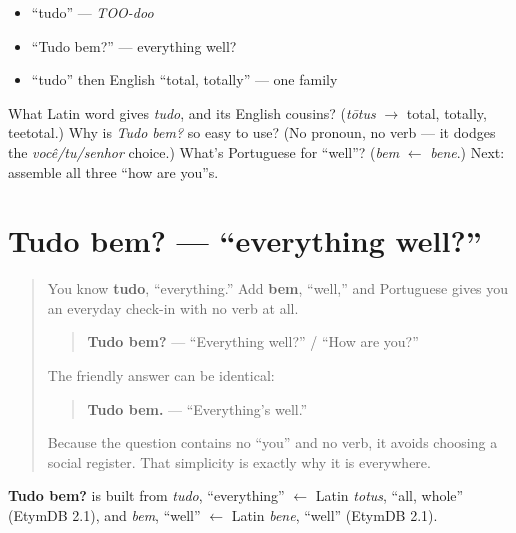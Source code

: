 \begin{itemize}
\raggedright
  \item \textquotedblleft{}tudo\textquotedblright{} — \emph{TOO-doo}
  \item \textquotedblleft{}Tudo bem?\textquotedblright{} — everything well?
  \item \textquotedblleft{}tudo\textquotedblright{} then English \textquotedblleft{}total, totally\textquotedblright{} — one family
\end{itemize}

\begin{tcolorbox}[breakable,colback=teal!4,colframe=teal!35!black,title={Before you move on}]
What Latin word gives \emph{tudo}, and its English cousins? (\emph{tōtus} $\to$ total, totally, teetotal.) Why is \emph{Tudo bem?} so easy to use? (No pronoun, no verb — it dodges the \emph{você/tu/senhor} choice.) What's Portuguese for \textquotedblleft{}well\textquotedblright{}? (\emph{bem} $\leftarrow$ \emph{bene}.) Next: assemble all three \textquotedblleft{}how are you\textquotedblright{}s.
\end{tcolorbox}
\section[Tudo bem?]{Tudo bem? — “everything well?”}

\label{lesson:PT-C02-tudo-bem}



\begin{quote}
You know \textbf{tudo}, “everything.” Add \textbf{bem}, “well,” and Portuguese gives you an everyday check-in with no verb at all.

\begin{quote}
\textbf{Tudo bem?} — “Everything well?” / “How are you?”
\end{quote}

The friendly answer can be identical:

\begin{quote}
\textbf{Tudo bem.} — “Everything’s well.”
\end{quote}

Because the question contains no “you” and no verb, it avoids choosing a social register. That simplicity is exactly why it is everywhere.
\end{quote}

\begin{cousinweb}
\textbf{Tudo bem?} is built from \emph{tudo}, \textquotedblleft{}everything\textquotedblright{} $\leftarrow$ Latin \emph{totus}, \textquotedblleft{}all, whole\textquotedblright{} (EtymDB 2.1), and \emph{bem}, \textquotedblleft{}well\textquotedblright{} $\leftarrow$ Latin \emph{bene}, \textquotedblleft{}well\textquotedblright{} (EtymDB 2.1).
\end{cousinweb}

